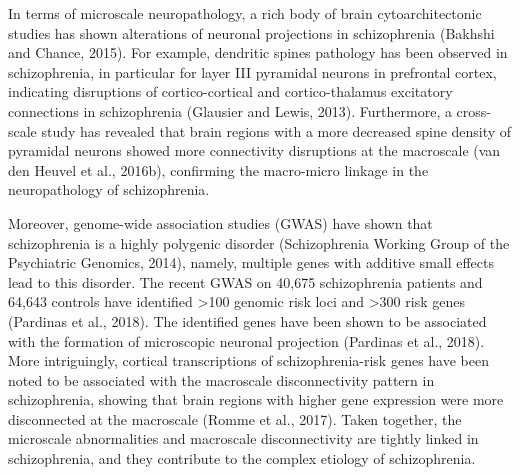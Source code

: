 \begin{refsection}
In terms of microscale neuropathology, a rich body of brain cytoarchitectonic studies has shown alterations of neuronal projections in schizophrenia (Bakhshi and Chance, 2015). For example, dendritic spines pathology has been observed in schizophrenia, in particular for layer III pyramidal neurons in prefrontal cortex, indicating disruptions of cortico-cortical and cortico-thalamus excitatory connections in schizophrenia (Glausier and Lewis, 2013). Furthermore, a cross-scale study has revealed that brain regions with a more decreased spine density of pyramidal neurons showed more connectivity disruptions at the macroscale (van den Heuvel et al., 2016b), confirming the macro-micro linkage in the neuropathology of schizophrenia. 

Moreover, genome-wide association studies (GWAS) have shown that schizophrenia is a highly polygenic disorder (Schizophrenia Working Group of the Psychiatric Genomics, 2014), namely, multiple genes with additive small effects lead to this disorder. The recent GWAS on 40,675 schizophrenia patients and 64,643 controls have identified >100 genomic risk loci and >300 risk genes (Pardinas et al., 2018). The identified genes have been shown to be associated with the formation of microscopic neuronal projection (Pardinas et al., 2018). More intriguingly, cortical transcriptions of schizophrenia-risk genes have been noted to be associated with the macroscale disconnectivity pattern in schizophrenia, showing that brain regions with higher gene expression were more disconnected at the macroscale (Romme et al., 2017). Taken together, the microscale abnormalities and macroscale disconnectivity are tightly linked in schizophrenia, and they contribute to the complex etiology of schizophrenia.


\end{refsection}
